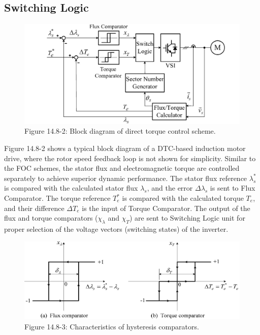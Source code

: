 \documentclass[letterpaper,12pt]{article}
\begin{document}
\subsection{Switching Logic}

\begin{figure}[h]
\centering
\includegraphics{graficos/img24.jpg}
\caption{Figure 14.8-2: Block diagram of direct torque control scheme.}
\label{fig:14.8-2}
\end{figure}
\FloatBarrier

Figure 14.8-2 shows a typical block diagram of a DTC-based induction motor drive, where the rotor speed feedback loop is not shown for simplicity. Similar to the FOC schemes, the stator flux and electromagnetic torque are controlled separately to achieve superior dynamic performance. The stator flux reference $\lambda_s^*$ is compared with the calculated stator flux $\lambda_s$, and the error $\Delta \lambda_s$ is sent to Flux Comparator. The torque reference $T_e^*$ is compared with the calculated torque $T_e$, and their difference $\Delta T_e$ is the input of Torque Comparator. The output of the flux and torque comparators ($\chi_\lambda$ and $\chi_T$) are sent to Switching Logic unit for proper selection of the voltage vectors (switching states) of the inverter.

\begin{figure}[h]
\centering
\includegraphics{graficos/img25.jpg}
\caption{Figure 14.8-3: Characteristics of hysteresis comparators.}
\label{fig:14.8-3}
\end{figure}
\FloatBarrier
\end{document}
